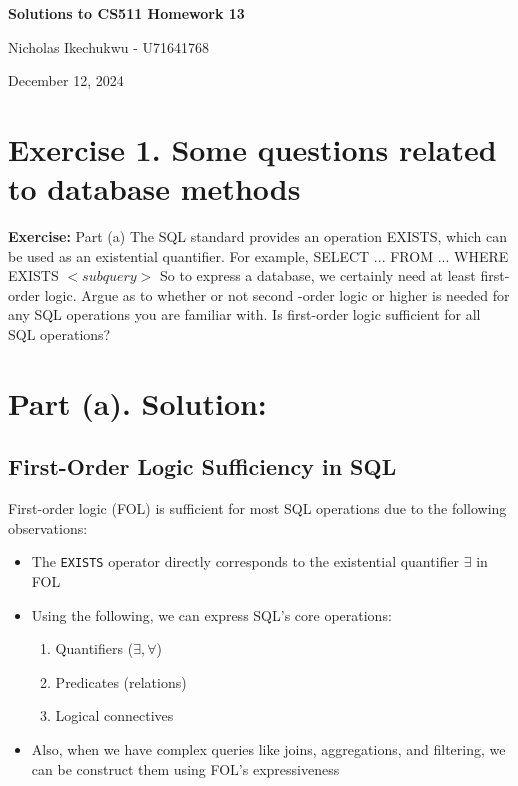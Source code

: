 \documentclass{article}
\begin{document}
\begin{center}
    \Large\textbf{Solutions to CS511 Homework 13}
    
    \vspace{0.5cm}
    
    \large Nicholas Ikechukwu - U71641768
    
    \vspace{0.3cm}
    
    \large December 12, 2024
\end{center}



\section*{Exercise 1. Some questions related to database methods}

\begin{mdframed}
    \vspace{1em}
        \textbf{Exercise:} Part (a) The SQL standard provides an operation EXISTS, which can be used as an existential
        quantifier. For example,
        SELECT ... FROM ... WHERE EXISTS \( < subquery > \)
        So to express a database, we certainly need at least first-order logic. Argue as to whether or not
        second -order logic or higher is needed for any SQL operations you are familiar with. Is first-order
        logic sufficient for all SQL operations?
    \vspace{1em}
\end{mdframed}


\section*{Part (a). Solution:}

\subsection*{First-Order Logic Sufficiency in SQL}

First-order logic (FOL) is  sufficient for most SQL operations due to the following observations:

\begin{itemize}
    \item The \texttt{EXISTS} operator directly corresponds to the existential quantifier $\exists$ in FOL
    \item Using the following, we can express SQL's core operations:
    \begin{enumerate}
        \item Quantifiers ($\exists, \forall$)
        \item Predicates (relations)
        \item Logical connectives
    \end{enumerate}
    \item Also, when we have complex queries like joins, aggregations, and filtering,
    we can be construct them using FOL's expressiveness
\end{itemize}
\end{document}
